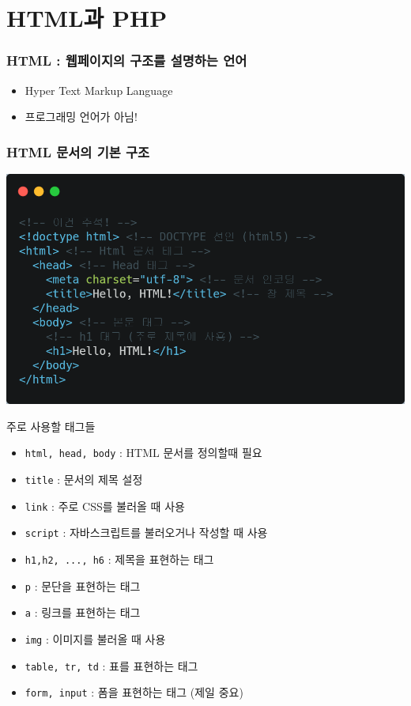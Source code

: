 \documentclass{beamer}
\begin{document}
\section{HTML과 PHP}
    \begin{frame}[fragile]
        \frametitle{HTML : 웹페이지의 구조를 설명하는 언어}
        \begin{itemize}
            \item Hyper Text Markup Language
            \item 프로그래밍 언어가 아님!
        \end{itemize}
    \end{frame}

    \begin{frame}[fragile]
        \frametitle{HTML 문서의 기본 구조}

        \begin{center}
            \includegraphics[height=0.7\textheight]{Images/structure-html.png}
        \end{center}
        
    \end{frame}

    \begin{frame}{주로 사용할 태그들}
        \begin{itemize}
            \item \texttt{html, head, body} : HTML 문서를 정의할때 필요
            \item \texttt{title} : 문서의 제목 설정
            \item \texttt{link} : 주로 CSS를 불러올 때 사용
            \item \texttt{script} : 자바스크립트를 불러오거나 작성할 때 사용
            \item \texttt{h1,h2, ..., h6} : 제목을 표현하는 태그
            \item \texttt{p} : 문단을 표현하는 태그
            \item \texttt{a} : 링크를 표현하는 태그
            \item \texttt{img} : 이미지를 불러올 때 사용
            \item \texttt{table, tr, td} : 표를 표현하는 태그
            \item \texttt{form, input} : 폼을 표현하는 태그 (제일 중요)
        \end{itemize}
    \end{frame}
\end{document}
